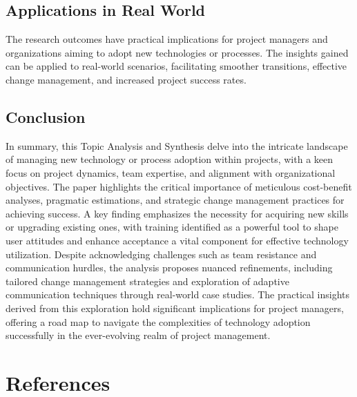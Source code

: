 \documentclass{article}
\begin{document}
\subsection{Applications in Real World}
The research outcomes have practical implications for project managers and organizations aiming to adopt new technologies or processes. The insights gained can be applied to real-world scenarios, facilitating smoother transitions, effective change management, and increased project success rates.

\subsection{Conclusion}
In summary, this Topic Analysis and Synthesis delve into the intricate landscape of managing new technology or process adoption within projects, with a keen focus on project dynamics, team expertise, and alignment with organizational objectives. The paper highlights the critical importance of meticulous cost-benefit analyses, pragmatic estimations, and strategic change management practices for achieving success. A key finding emphasizes the necessity for acquiring new skills or upgrading existing ones, with training identified as a powerful tool to shape user attitudes and enhance acceptance a vital component for effective technology utilization. Despite acknowledging challenges such as team resistance and communication hurdles, the analysis proposes nuanced refinements, including tailored change management strategies and exploration of adaptive communication techniques through real-world case studies. The practical insights derived from this exploration hold significant implications for project managers, offering a road map to navigate the complexities of technology adoption successfully in the ever-evolving realm of project management.

\section{References}
\end{document}

